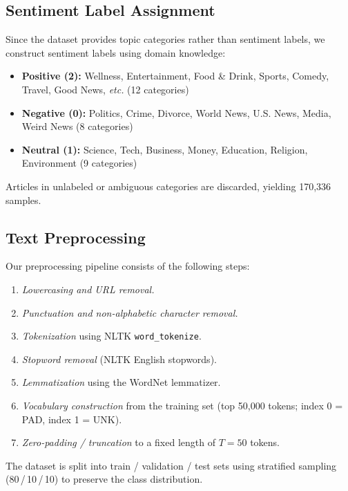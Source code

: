 \documentclass[conference]{IEEEtran}
\begin{document}
\subsection{Sentiment Label Assignment}
Since the dataset provides topic categories rather than sentiment
labels, we construct sentiment labels using domain knowledge:

\begin{itemize}
  \item \textbf{Positive (2):} Wellness, Entertainment, Food \&
        Drink, Sports, Comedy, Travel, Good News, \textit{etc.}
        (12 categories)
  \item \textbf{Negative (0):} Politics, Crime, Divorce, World
        News, U.S. News, Media, Weird News (8 categories)
  \item \textbf{Neutral (1):} Science, Tech, Business, Money,
        Education, Religion, Environment (9 categories)
\end{itemize}

Articles in unlabeled or ambiguous categories are discarded, yielding
170,336 samples.

\subsection{Text Preprocessing}
Our preprocessing pipeline consists of the following steps:
\begin{enumerate}
  \item \textit{Lowercasing and URL removal.}
  \item \textit{Punctuation and non-alphabetic character removal.}
  \item \textit{Tokenization} using NLTK \texttt{word\_tokenize}.
  \item \textit{Stopword removal} (NLTK English stopwords).
  \item \textit{Lemmatization} using the WordNet lemmatizer.
  \item \textit{Vocabulary construction} from the training set
        (top 50,000 tokens; index 0 = PAD, index 1 = UNK).
  \item \textit{Zero-padding / truncation} to a fixed length of
        $T = 50$ tokens.
\end{enumerate}

The dataset is split into train / validation / test sets using
stratified sampling (80\,/\,10\,/\,10) to preserve the class distribution.

\end{document}
